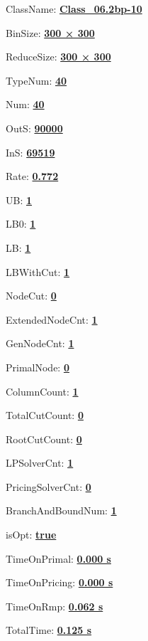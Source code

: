 \documentclass[11pt]{article}
\begin{document}
\pagestyle{empty}


ClassName: \underline{\textbf{Class_06.2bp-10}}
\par
BinSize: \underline{\textbf{300 × 300}}
\par
ReduceSize: \underline{\textbf{300 × 300}}
\par
TypeNum: \underline{\textbf{40}}
\par
Num: \underline{\textbf{40}}
\par
OutS: \underline{\textbf{90000}}
\par
InS: \underline{\textbf{69519}}
\par
Rate: \underline{\textbf{0.772}}
\par
UB: \underline{\textbf{1}}
\par
LB0: \underline{\textbf{1}}
\par
LB: \underline{\textbf{1}}
\par
LBWithCut: \underline{\textbf{1}}
\par
NodeCut: \underline{\textbf{0}}
\par
ExtendedNodeCnt: \underline{\textbf{1}}
\par
GenNodeCnt: \underline{\textbf{1}}
\par
PrimalNode: \underline{\textbf{0}}
\par
ColumnCount: \underline{\textbf{1}}
\par
TotalCutCount: \underline{\textbf{0}}
\par
RootCutCount: \underline{\textbf{0}}
\par
LPSolverCnt: \underline{\textbf{1}}
\par
PricingSolverCnt: \underline{\textbf{0}}
\par
BranchAndBoundNum: \underline{\textbf{1}}
\par
isOpt: \underline{\textbf{true}}
\par
TimeOnPrimal: \underline{\textbf{0.000 s}}
\par
TimeOnPricing: \underline{\textbf{0.000 s}}
\par
TimeOnRmp: \underline{\textbf{0.062 s}}
\par
TotalTime: \underline{\textbf{0.125 s}}
\par
\newpage
\end{document}
